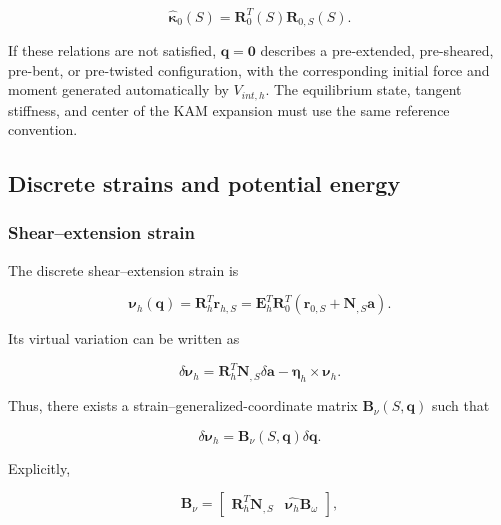\begin{equation}
\label{eq:galerkin-2-16}
{\widehat{\bm{\kappa}}}_{0}(S) = \mathbf{R}_{0}^{T}(S)\mathbf{R}_{0,S}(S).
\end{equation}

If these relations are not satisfied, \(\mathbf{q} = \mathbf{0}\) describes a pre-extended, pre-sheared, pre-bent, or pre-twisted configuration, with the corresponding initial force and moment generated automatically by \(V_{int,h}\). The equilibrium state, tangent stiffness, and center of the KAM expansion must use the same reference convention.

\subsection{Discrete strains and potential energy}\label{sec:galerkin-2-3}

\subsubsection{Shear--extension strain}\label{sec:galerkin-2-3-1}

The discrete shear--extension strain is

\begin{equation}
\label{eq:galerkin-2-17}
\bm{\nu}_{h}\left( \mathbf{q} \right) = \mathbf{R}_{h}^{T}\mathbf{r}_{h,S} = \mathbf{E}_{h}^{T}\mathbf{R}_{0}^{T}\left( \mathbf{r}_{0,S} + \mathbf{N}_{,S}\mathbf{a} \right).
\end{equation}

Its virtual variation can be written as

\begin{equation}
\label{eq:galerkin-2-18}
\delta\bm{\nu}_{h} = \mathbf{R}_{h}^{T}\mathbf{N}_{,S}\delta\mathbf{a} - \bm{\eta}_{h} \times \bm{\nu}_{h}.
\end{equation}

Thus, there exists a strain--generalized-coordinate matrix \(\mathbf{B}_{\nu}\left( S,\mathbf{q} \right)\) such that

\begin{equation}
\label{eq:galerkin-2-19}
\delta\bm{\nu}_{h} = \mathbf{B}_{\nu}\left( S,\mathbf{q} \right)\delta\mathbf{q}.
\end{equation}

Explicitly,

\begin{equation}
\label{eq:galerkin-2-20}
\mathbf{B}_{\nu} = \begin{bmatrix}
\mathbf{R}_{h}^{T}\mathbf{N}_{,S} & \widehat{\bm{\nu}_{h}}\mathbf{B}_{\omega}
\end{bmatrix},
\end{equation}

